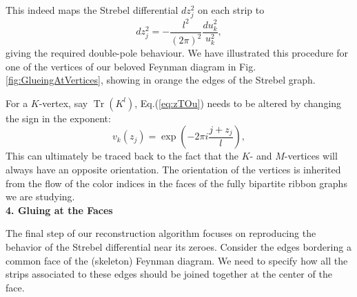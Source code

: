 \documentclass[english]{article}
\DeclareMathOperator{\Tr}{Tr}
\renewcommand{\>}{\rangle}
\newcommand{\<}{\langle}
\renewcommand{\(}{\left(}
\renewcommand{\)}{\right)}
\begin{document}
This indeed maps the Strebel differential $dz_{j}^2$ on each strip to 
\begin{equation}
   dz_{j}^{2} = - \frac{l^2}{(2\pi)^2} \frac{du_{k}^2}{u_{k}^2},
\end{equation}
giving the required double-pole behaviour. 
We have illustrated this procedure for one of the vertices of our beloved Feynman diagram in Fig. \ref{fig:GlueingAtVertices}, showing in orange the edges of the Strebel graph.

For a $K$-vertex, say $\Tr(K^l)$, Eq.(\eqref{eq:zTOu}) needs to be altered by changing the sign in the exponent:
\begin{equation} \label{eq:zTOv}
    v_{k}(z_j)= \exp({-2 \pi i \frac{j+z_j}{l}}),
\end{equation}
This can ultimately be traced back to the fact that the $K$- and $M$-vertices will always have an opposite orientation. The orientation of the vertices is inherited from the flow of the color indices in the faces of the fully bipartite ribbon graphs we are studying. \\



\noindent\textbf{4. Gluing at the Faces}

The final step of our reconstruction algorithm focuses on reproducing the behavior of the Strebel differential near its zeroes. Consider the edges bordering a common face of the (skeleton) Feynman diagram. We need to specify how all the strips associated to these edges should be joined together at the center of the face. 
\end{document}
